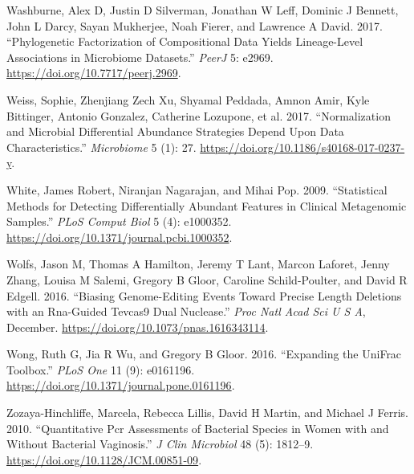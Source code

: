 \documentclass[onecolumn]{article}
\begin{document}
\leavevmode\hypertarget{ref-Washburne:2017aa}{}%
Washburne, Alex D, Justin D Silverman, Jonathan W Leff, Dominic J Bennett, John L Darcy, Sayan Mukherjee, Noah Fierer, and Lawrence A David. 2017. ``Phylogenetic Factorization of Compositional Data Yields Lineage-Level Associations in Microbiome Datasets.'' \emph{PeerJ} 5: e2969. \url{https://doi.org/10.7717/peerj.2969}.

\leavevmode\hypertarget{ref-Weiss:2017aa}{}%
Weiss, Sophie, Zhenjiang Zech Xu, Shyamal Peddada, Amnon Amir, Kyle Bittinger, Antonio Gonzalez, Catherine Lozupone, et al. 2017. ``Normalization and Microbial Differential Abundance Strategies Depend Upon Data Characteristics.'' \emph{Microbiome} 5 (1): 27. \url{https://doi.org/10.1186/s40168-017-0237-y}.

\leavevmode\hypertarget{ref-White:2009}{}%
White, James Robert, Niranjan Nagarajan, and Mihai Pop. 2009. ``Statistical Methods for Detecting Differentially Abundant Features in Clinical Metagenomic Samples.'' \emph{PLoS Comput Biol} 5 (4): e1000352. \url{https://doi.org/10.1371/journal.pcbi.1000352}.

\leavevmode\hypertarget{ref-Wolfs:2016aa}{}%
Wolfs, Jason M, Thomas A Hamilton, Jeremy T Lant, Marcon Laforet, Jenny Zhang, Louisa M Salemi, Gregory B Gloor, Caroline Schild-Poulter, and David R Edgell. 2016. ``Biasing Genome-Editing Events Toward Precise Length Deletions with an Rna-Guided Tevcas9 Dual Nuclease.'' \emph{Proc Natl Acad Sci U S A}, December. \url{https://doi.org/10.1073/pnas.1616343114}.

\leavevmode\hypertarget{ref-Wong:2016aa}{}%
Wong, Ruth G, Jia R Wu, and Gregory B Gloor. 2016. ``Expanding the UniFrac Toolbox.'' \emph{PLoS One} 11 (9): e0161196. \url{https://doi.org/10.1371/journal.pone.0161196}.

\leavevmode\hypertarget{ref-Zozaya:2010}{}%
Zozaya-Hinchliffe, Marcela, Rebecca Lillis, David H Martin, and Michael J Ferris. 2010. ``Quantitative Pcr Assessments of Bacterial Species in Women with and Without Bacterial Vaginosis.'' \emph{J Clin Microbiol} 48 (5): 1812--9. \url{https://doi.org/10.1128/JCM.00851-09}.
\end{document}
